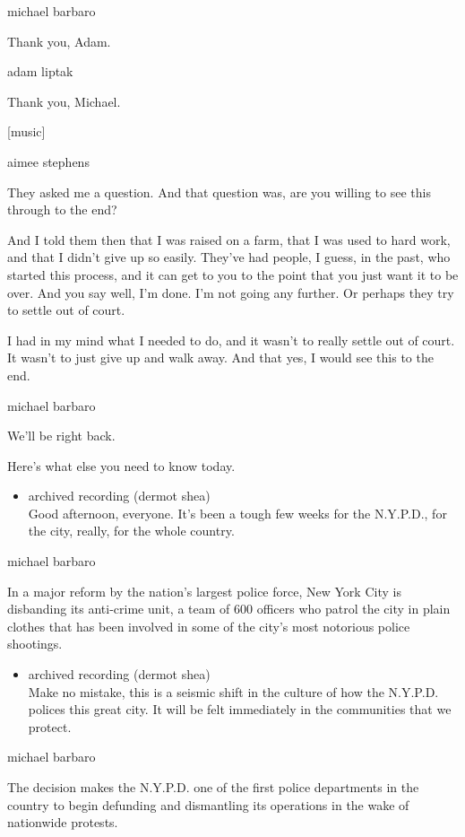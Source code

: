 michael barbaro

Thank you, Adam.

adam liptak

Thank you, Michael.

{[}music{]}

aimee stephens

They asked me a question. And that question was, are you willing to see
this through to the end?

And I told them then that I was raised on a farm, that I was used to
hard work, and that I didn't give up so easily. They've had people, I
guess, in the past, who started this process, and it can get to you to
the point that you just want it to be over. And you say well, I'm done.
I'm not going any further. Or perhaps they try to settle out of court.

I had in my mind what I needed to do, and it wasn't to really settle out
of court. It wasn't to just give up and walk away. And that yes, I would
see this to the end.

michael barbaro

We'll be right back.

Here's what else you need to know today.

\begin{itemize}
\tightlist
\item
  archived recording (dermot shea)\\
  Good afternoon, everyone. It's been a tough few weeks for the
  N.Y.P.D., for the city, really, for the whole country.
\end{itemize}

michael barbaro

In a major reform by the nation's largest police force, New York City is
disbanding its anti-crime unit, a team of 600 officers who patrol the
city in plain clothes that has been involved in some of the city's most
notorious police shootings.

\begin{itemize}
\tightlist
\item
  archived recording (dermot shea)\\
  Make no mistake, this is a seismic shift in the culture of how the
  N.Y.P.D. polices this great city. It will be felt immediately in the
  communities that we protect.
\end{itemize}

michael barbaro

The decision makes the N.Y.P.D. one of the first police departments in
the country to begin defunding and dismantling its operations in the
wake of nationwide protests.

